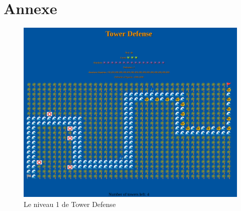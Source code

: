\documentclass{article}
\begin{document}
\newpage
\section{Annexe}
\begin{figure}[!h]
    \centering
    \includegraphics[width=15cm]{HTML_Lvl1.png}
    \caption{Le niveau 1 de Tower Defense}
    \label{fig:lvl1}
\end{figure}
\end{document}
